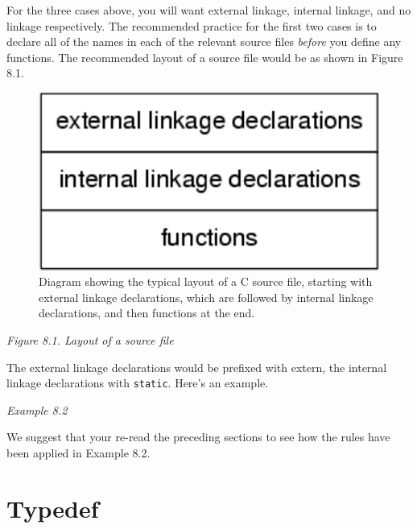    For the three cases above, you will want external linkage, internal
    linkage, and no linkage respectively. The recommended practice for the
    first two cases is to declare all of the names in each of the relevant
    source files \textit{before} you define any functions. The recommended
    layout of a source file would be as shown in Figure 8.1.


   \begin{figure}\centering\includegraphics[type=pdf,read=.pdf,ext=.pdf,scale=1.0]{figure/8.1}\caption{Diagram showing the typical layout of a C source file, starting            with external linkage declarations, which are followed by internal            linkage declarations, and then functions at the end.}\end{figure}

\begin{center}\textit{Figure 8.1. Layout of a source file}\end{center}


   The external linkage declarations would be prefixed with extern, the
    internal linkage declarations with \texttt{static}. Here's an
    example.


\begin{center}\textit{Example 8.2}\end{center}


   We suggest that your re-read the preceding sections to see how the
    rules have been applied in Example 8.2.


  

 
        \section{Typedef}
        


